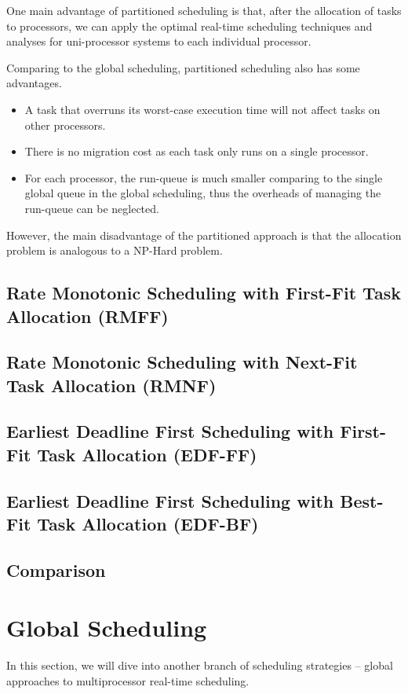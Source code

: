 \documentclass[preprint,12pt]{elsarticle}
\begin{document}
One main advantage of partitioned scheduling is that, after the allocation of tasks to processors, we can apply the optimal real-time scheduling techniques and analyses for uni-processor systems to each individual processor. 

Comparing to the global scheduling, partitioned scheduling also has some advantages. 
\begin{itemize}
\item A task that overruns its worst-case execution time will not affect tasks on other processors.
\item There is no migration cost as each task only runs on a single processor.
\item For each processor, the run-queue is much smaller comparing to the single global queue in the global scheduling, thus the overheads of managing the run-queue can be neglected. 
\end{itemize}

However, the main disadvantage of the partitioned approach is that the allocation problem is analogous to a NP-Hard problem. 

\subsection{Rate Monotonic Scheduling with First-Fit Task Allocation (RMFF)}

\subsection{Rate Monotonic Scheduling with Next-Fit Task Allocation (RMNF)}

\subsection{Earliest Deadline First Scheduling with First-Fit Task Allocation (EDF-FF)}

\subsection{Earliest Deadline First Scheduling with Best-Fit Task Allocation (EDF-BF)}

\subsection{Comparison}

\newpage
\section{Global Scheduling} \label{S:4}
In this section, we will dive into another branch of scheduling strategies --
global approaches to multiprocessor real-time scheduling.
\end{document}
